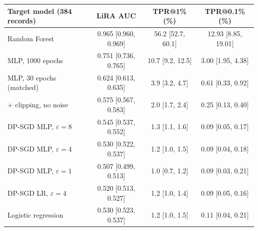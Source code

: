 \begin{tabular}{@{}lccc@{}}
\toprule
Target model (384 records) & LiRA AUC & TPR@1\% (\%) & TPR@0.1\% (\%) \\
\midrule
Random Forest & 0.965 {\scriptsize[0.960, 0.969]} & 56.2 {\scriptsize[52.7, 60.1]} & 12.93 {\scriptsize[8.85, 19.01]} \\
MLP, 1000 epochs & 0.751 {\scriptsize[0.736, 0.765]} & 10.7 {\scriptsize[9.2, 12.5]} & 3.00 {\scriptsize[1.95, 4.38]} \\
MLP, 30 epochs (matched) & 0.624 {\scriptsize[0.613, 0.635]} & 3.9 {\scriptsize[3.2, 4.7]} & 0.61 {\scriptsize[0.33, 0.92]} \\
+ clipping, no noise & 0.575 {\scriptsize[0.567, 0.583]} & 2.0 {\scriptsize[1.7, 2.4]} & 0.25 {\scriptsize[0.13, 0.40]} \\
DP-SGD MLP, $\varepsilon{=}8$ & 0.545 {\scriptsize[0.537, 0.552]} & 1.3 {\scriptsize[1.1, 1.6]} & 0.09 {\scriptsize[0.05, 0.17]} \\
DP-SGD MLP, $\varepsilon{=}4$ & 0.530 {\scriptsize[0.522, 0.537]} & 1.2 {\scriptsize[1.0, 1.5]} & 0.09 {\scriptsize[0.04, 0.18]} \\
DP-SGD MLP, $\varepsilon{=}1$ & 0.507 {\scriptsize[0.499, 0.513]} & 1.0 {\scriptsize[0.7, 1.2]} & 0.09 {\scriptsize[0.03, 0.21]} \\
DP-SGD LR, $\varepsilon{=}4$ & 0.520 {\scriptsize[0.513, 0.527]} & 1.2 {\scriptsize[1.0, 1.4]} & 0.09 {\scriptsize[0.05, 0.16]} \\
Logistic regression & 0.530 {\scriptsize[0.523, 0.537]} & 1.2 {\scriptsize[1.0, 1.5]} & 0.11 {\scriptsize[0.04, 0.21]} \\
\bottomrule
\end{tabular}
